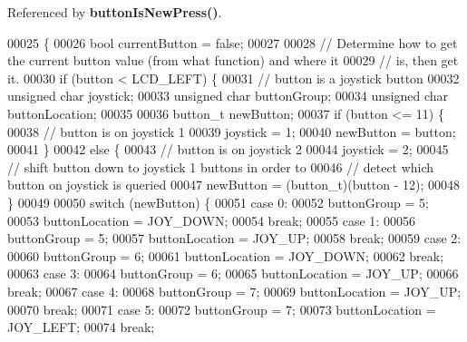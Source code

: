 Referenced by \textbf{ button\+Is\+New\+Press()}.


\begin{DoxyCode}
00025                                      \{
00026     \textcolor{keywordtype}{bool} currentButton = \textcolor{keyword}{false};
00027 
00028     \textcolor{comment}{// Determine how to get the current button value (from what function) and where it}
00029     \textcolor{comment}{// is, then get it.}
00030     \textcolor{keywordflow}{if} (button < LCD_LEFT) \{
00031         \textcolor{comment}{// button is a joystick button}
00032         \textcolor{keywordtype}{unsigned} \textcolor{keywordtype}{char} joystick;
00033         \textcolor{keywordtype}{unsigned} \textcolor{keywordtype}{char} buttonGroup;
00034         \textcolor{keywordtype}{unsigned} \textcolor{keywordtype}{char} buttonLocation;
00035 
00036         button_t newButton;
00037         \textcolor{keywordflow}{if} (button <= 11) \{
00038             \textcolor{comment}{// button is on joystick 1}
00039             joystick = 1;
00040             newButton = button;
00041         \}
00042         \textcolor{keywordflow}{else} \{
00043             \textcolor{comment}{// button is on joystick 2}
00044             joystick = 2;
00045             \textcolor{comment}{// shift button down to joystick 1 buttons in order to}
00046             \textcolor{comment}{// detect which button on joystick is queried}
00047             newButton = (button_t)(button - 12);
00048         \}
00049 
00050         \textcolor{keywordflow}{switch} (newButton) \{
00051         \textcolor{keywordflow}{case} 0:
00052             buttonGroup = 5;
00053             buttonLocation = JOY\_DOWN;
00054             \textcolor{keywordflow}{break};
00055         \textcolor{keywordflow}{case} 1:
00056             buttonGroup = 5;
00057             buttonLocation = JOY\_UP;
00058             \textcolor{keywordflow}{break};
00059         \textcolor{keywordflow}{case} 2:
00060             buttonGroup = 6;
00061             buttonLocation = JOY\_DOWN;
00062             \textcolor{keywordflow}{break};
00063         \textcolor{keywordflow}{case} 3:
00064             buttonGroup = 6;
00065             buttonLocation = JOY\_UP;
00066             \textcolor{keywordflow}{break};
00067         \textcolor{keywordflow}{case} 4:
00068             buttonGroup = 7;
00069             buttonLocation = JOY\_UP;
00070             \textcolor{keywordflow}{break};
00071         \textcolor{keywordflow}{case} 5:
00072             buttonGroup = 7;
00073             buttonLocation = JOY\_LEFT;
00074             \textcolor{keywordflow}{break};

\end{DoxyCode}
